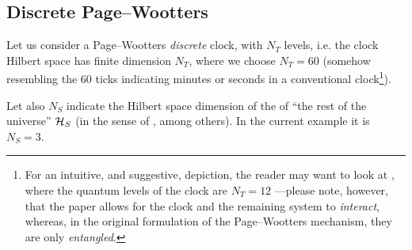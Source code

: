 \subsection{Discrete Page--Wootters}

Let us consider a Page--Wootters \emph{discrete} clock, with $N_{T}$ levels,
i.e. the clock Hilbert space has finite dimension $N_{T}$,
where we choose $N_{T} = 60$
(somehow resembling the 60 ticks indicating minutes or seconds
in a conventional clock\footnote{
  For an intuitive, and suggestive, depiction, the reader may want to look at \cite[Fig.~1]{QClockPic},
  where the quantum levels of the clock are $N_{T} = 12$
  ---please note, however, that the paper allows for the clock
  and the remaining system to \emph{interact}, whereas, in the original formulation
  of the Page--Wootters mechanism,
  they are only \emph{entangled}.
}).

Let also $N_S$ indicate the Hilbert space dimension of the of ``the rest of the universe'' $\mathcal{H}_S$
(in the sense of \cite{Marletto:Evolution}, among others). In the current example
it is $N_S = 3$.

